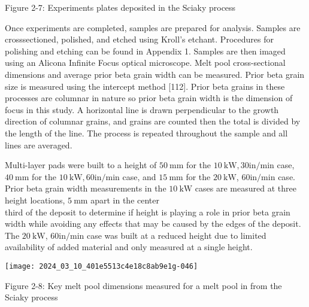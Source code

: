 \documentclass[10pt]{article}
\begin{document}
Figure 2-7: Experiments plates deposited in the Sciaky process

Once experiments are completed, samples are prepared for analysis. Samples are crosssectioned, polished, and etched using Kroll's etchant. Procedures for polishing and etching can be found in Appendix 1. Samples are then imaged using an Alicona Infinite Focus optical microscope. Melt pool cross-sectional dimensions and average prior beta grain width can be measured. Prior beta grain size is measured using the intercept method [112]. Prior beta grains in these processes are columnar in nature so prior beta grain width is the dimension of focus in this study. A horizontal line is drawn perpendicular to the growth direction of columnar grains, and grains are counted then the total is divided by the length of the line. The process is repeated throughout the sample and all lines are averaged.

Multi-layer pads were built to a height of $50 \mathrm{~mm}$ for the $10 \mathrm{~kW}, 30 \mathrm{in} / \mathrm{min}$ case, $40 \mathrm{~mm}$ for the $10 \mathrm{~kW}, 60 \mathrm{in} / \mathrm{min}$ case, and $15 \mathrm{~mm}$ for the $20 \mathrm{~kW}$, $60 \mathrm{in} / \mathrm{min}$ case. Prior beta grain width measurements in the $10 \mathrm{~kW}$ cases are measured at three height locations, $5 \mathrm{~mm}$ apart in the center\\
third of the deposit to determine if height is playing a role in prior beta grain width while avoiding any effects that may be caused by the edges of the deposit. The $20 \mathrm{~kW}$, $60 \mathrm{in} / \mathrm{min}$ case was built at a reduced height due to limited availability of added material and only measured at a single height.

\begin{center}
\texttt{[image: 2024\_03\_10\_401e5513c4e18c8ab9e1g-046]}
\end{center}

Figure 2-8: Key melt pool dimensions measured for a melt pool in from the Sciaky process
\end{document}
